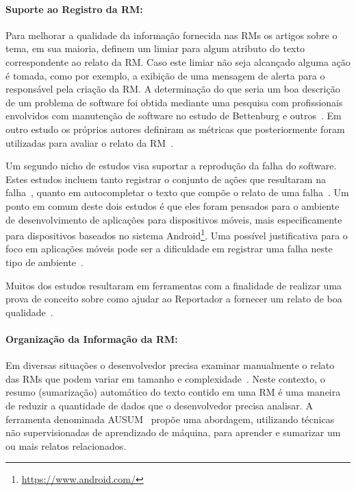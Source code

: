 \paragraph{Suporte ao Registro da RM:}

Para melhorar a qualidade da informação fornecida nas RMs os artigos sobre o
tema, em sua maioria, definem um limiar para algum atributo do texto
correspondente ao relato da RM\@. Caso este limiar não seja alcançado alguma
ação é tomada, como por exemplo, a exibição de uma mensagem de alerta para o
responsável pela criação da RM\@. A determinação do que seria um boa descrição
de um problema de software foi obtida mediante uma pesquisa com profissionais
envolvidos com manutenção de software no estudo de Bettenburg e
outros~\cite{Bettenburg2008a}. Em outro estudo os próprios autores definiram as
métricas que posteriormente foram utilizadas para avaliar o relato da
RM~\cite{Tu:2014:MQI:2677832.2677844}.

Um segundo nicho de estudos visa suportar a reprodução da falha do software.
Estes estudos incluem tanto registrar o conjunto de ações que resultaram na
falha~\cite{White:2015:GRR:2820282.2820291}, quanto em autocompletar o texto que
compõe o relato de uma falha~\cite{moran2015auto}. Um ponto em comum deste dois
estudos é que eles foram pensados para o ambiente de desenvolvimento de
aplicações para dispositivos móveis, mais especificamente para dispositivos
baseados no sistema Android\footnote{\url{https://www.android.com/}}. Uma
possível justificativa para o foco em aplicações móveis pode ser a dificuldade
em registrar uma falha neste tipo de
ambiente~\cite{White:2015:GRR:2820282.2820291, moran2015auto}.

Muitos dos estudos resultaram em ferramentas com a finalidade de realizar uma
prova de conceito sobre como ajudar ao Reportador a fornecer um relato de boa
qualidade~\cite{Tu:2014:MQI:2677832.2677844, Bettenburg2008a,
    Wu2011a,White:2015:GRR:2820282.2820291,moran2015auto}.

\paragraph{Organização da Informação da RM:}

Em diversas situações o desenvolvedor precisa examinar manualmente o relato das
RMs que podem variar em tamanho e complexidade~\cite{mani2012ausum}. Neste
contexto, o resumo (sumarização) automático do texto contido em uma RM é uma
maneira de reduzir a quantidade de dados que o desenvolvedor precisa analisar.
A ferramenta denominada AUSUM~\cite{mani2012ausum} propõe uma abordagem,
utilizando técnicas não supervisionadas de aprendizado de máquina, para aprender
e sumarizar um ou mais relatos relacionados.

